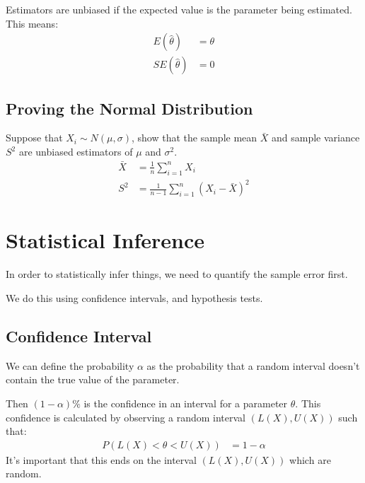                 Estimators are unbiased if the expected value  is the parameter being estimated.
                This means:
                \begin{align*}
                    E(\hat{\theta}) &= \theta \\
                    SE(\hat{\theta}) &= 0
                \end{align*}

                \subsection{Proving the Normal Distribution} %
                \label{sub:proving_the_normal_distribution}
                    Suppose that $X_i \sim N(\mu, \sigma)$, show that the sample mean $\bar{X}$ and sample variance $S^2$ are unbiased estimators of $\mu$ and $\sigma^2$.
                    \begin{align*}
                        \bar{X} &= \frac{1}{n} \sum_{i = 1}^{n} X_i \\
                        S^2 &= \frac{1}{n-1} \sum_{i=1}^n (X_i - \bar{X})^2
                    \end{align*}

            \section{Statistical Inference} %
            \label{sec:statistical_inference}
                In order to statistically infer things, we need to quantify the sample error first.

                We do this using confidence intervals, and hypothesis tests.
                \subsection{Confidence Interval} %
                \label{sub:confidence_interval}
                    We can define the probability $\alpha$ as the probability that a random interval doesn't contain the true value of the parameter.

                    Then $(1- \alpha)\%$ is the confidence in an interval for a parameter $\theta$.
                    This confidence is calculated by observing a random interval $(L(X), U(X))$ such that:
                    \begin{align*}
                        P(L(X) < \theta < U(X)) &= 1 - \alpha
                    \end{align*}
                    It's important that this ends on the interval $(L(X), U(X))$ which are random.

